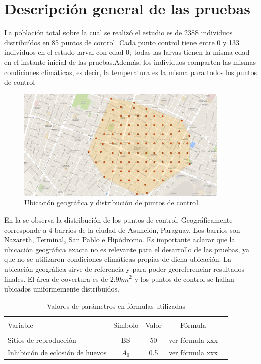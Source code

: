 \section{Descripción general de las pruebas}
La población total sobre la cual se realizó el estudio es de 2388 individuos
distribuídos en 85 puntos de control. Cada punto control tiene entre 0 y 133
individuos en el estado larval con edad 0; todas las larvas tienen la misma edad
en el instante inicial de las pruebas.Además, los individuos comparten
las mismas condiciones climáticas, es decir, la temperatura es la misma
para todos los puntos de control \\

\begin{figure}
\centering
\includegraphics[width=0.9\textwidth]{./capitulo-6/graphics/puntoscontroldistribuido.png}
\caption{\label{fig:distribucion-puntos}Ubicación geográfica y distribución de puntos de control.}
\end{figure}


En la  se observa la distribución de los puntos de control.
Geográficamente corresponde a 4 barrios de la ciudad de Asunción, Paraguay. Los barrios son
Nazareth, Terminal, San Pablo e Hipódromo. Es importante aclarar que la ubicación geográfica
exacta no es relevante para el desarrollo de las pruebas, ya que no se utilizaron
condiciones climáticas propias de dicha ubicación. La ubicación geográfica sirve
de referencia y para poder georeferenciar resultados finales. El área de covertura
es de 2.9$km^2$ y los puntos de control se hallan ubicados uniformemente distribuidos.\\


\begin{table}
    \begin{center}
        \caption{ \label{tab:valores-formulas} Valores de parámetros en fórmulas utilizadas}
        \begin{tabular}{p{3cm} c c c c}
            \hline \\
            Variable & Simbolo & Valor & Fórmula \\
            \hline
            \hline \\
            Sitios de reproducción &  BS & 50 & ver fórmula xxx\\
            Inhibición de eclosión de huevos & $A_{0}$ & 0.5 & ver fórmula xxx\\
        \end{tabular}
    \end{center}
\end{table}

